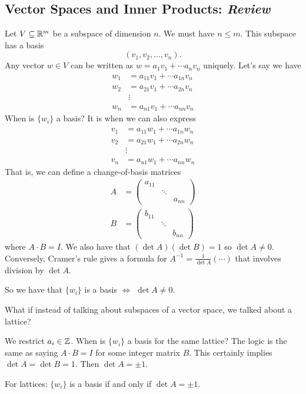 \subsection{Vector Spaces and Inner Products: \emph{Review}}
Let $V\subseteq \mathbb R^m$ be a subspace of dimension $n$. We must have $n\leq m$. This subspace has a basis
\[\left( v_1, v_2, \dots, v_n \right).\]
Any vector $w\in V$ can be written as $w = a_1v_1 + \cdots a_nv_n$ uniquely. Let's say we have
\begin{align*}
    w_1 & = a_{11}v_1 + \cdots a_{1n}v_n \\
    w_2 & = a_{21}v_1 + \cdots a_{2n}v_n \\
        & \vdots                         \\
    w_n & = a_{n1}v_1 + \cdots a_{nn}v_n
\end{align*}
When is $\{w_i\}$ a basis? It is when we can also express
\begin{align*}
    v_1 & = a_{11}w_1 + \cdots a_{1n}w_n \\
    v_2 & = a_{21}w_1 + \cdots a_{2n}w_n \\
        & \vdots                         \\
    v_n & = a_{n1}w_1 + \cdots a_{nn}w_n
\end{align*}
That is, we can define a change-of-basis matrices
\begin{align*}
    A & = \begin{pmatrix}
              a_{11} &        &        \\
                     & \ddots &        \\
                     &        & a_{nn}
          \end{pmatrix} \\
    B & = \begin{pmatrix}
              b_{11} &        &        \\
                     & \ddots &        \\
                     &        & b_{nn}
          \end{pmatrix}
\end{align*}
where $A\cdot B = I$. We also have that $(\det A)(\det B) = 1$ so $\det A \neq 0$. Conversely, Cramer's rule gives a formula for $A^{-1} = \frac{1}{\det A}(\cdots)$ that involves division by $\det A$.

So we have that $\{w_i\}$ is a basis $\iff$ $\det A \neq 0$.

\begin{ques*}
    What if instead of talking about subspaces of a vector space, we talked about a lattice?
\end{ques*}

We restrict $a_i\in\mathbb Z$. When is $\{w_i\}$ a basis for the same lattice? The logic is the same as saying $A\cdot B = I$ for some integer matrix $B$. This certainly implies $\det A = \det B = 1$. Then $\det A = \pm 1$.

For lattices: $\{w_i\}$ is a basis if and only if $\det A = \pm 1$. 